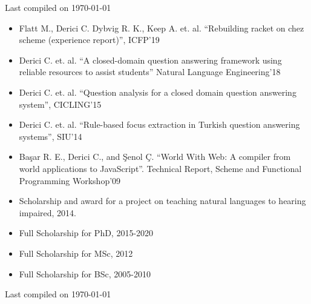 \vfill \hfill \small Last compiled on \today

\newpage

\spacedhrule{0.5em}{-0.4em} %



\begin{itemize}
\item Flatt M., Derici C. Dybvig R. K., Keep A. et. al. “Rebuilding racket on chez scheme (experience report)”, ICFP'19

\item Derici C. et. al. “A closed-domain question answering framework using reliable resources to assist students” \newline Natural Language Engineering'18

\item Derici C. et. al. “Question analysis for a closed domain question answering system”, CICLING'15

\item Derici C. et. al. “Rule-based focus extraction in Turkish question answering systems”, SIU'14

\item Başar R. E., Derici C., and Şenol Ç. “World With Web: A compiler from world applications to JavaScript”. Technical Report, Scheme and Functional Programming Workshop'09
\end{itemize}

\spacedhrule{0.5em}{-0.4em} %


\begin{itemize}
    \item Scholarship and award for a project on teaching natural languages to hearing impaired, 2014.
    \item Full Scholarship for PhD, 2015-2020
    \item Full Scholarship for MSc, 2012 
    \item Full Scholarship for BSc, 2005-2010
\end{itemize}

\spacedhrule{0.5em}{-0.4em} %

\vfill \hfill \small Last compiled on \today

